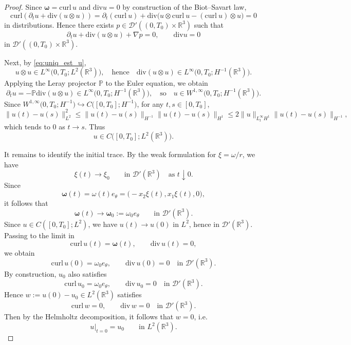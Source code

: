 \documentclass[reqno,11pt]{amsart}
\renewcommand{\div}{\mathrm{div}}
\begin{document}
\begin{proof}
Since $\boldsymbol{\omega}=\mathrm{curl}\,  u$ and $\div u=0$ by construction of the Biot--Savart law,
\[
\mathrm{curl}\left(\partial_tu+\div(u\otimes u)\right)
=
\partial_t(\mathrm{curl} \ u)+\div\bigl(u\otimes \mathrm{curl}\ u-( \mathrm{curl}\ u)\otimes u\bigr)=0
\]
in distributions. Hence there exists
$p\in\mathcal D'((0,T_0)\times\mathbb R^3)$ such that
\[
\partial_t u+\div(u\otimes u)+\nabla p=0,
\qquad
\div u=0
\]
in $\mathcal D'((0,T_0)\times\mathbb R^3)$.

Next, by \eqref{eq:uniq_est_u},
\[
u\otimes u\in L^\infty\!\bigl(0,T_0;L^2(\mathbb R^3)\bigr),
\quad \text{hence} \quad
\div(u\otimes u)\in L^\infty\!\bigl(0,T_0;H^{-1}(\mathbb R^3)\bigr).
\]
Applying the Leray projector $\mathbb P$ to the Euler equation, we obtain
\[
\partial_tu=-\mathbb P\div(u\otimes u)
\in L^\infty\!\bigl(0,T_0;H^{-1}(\mathbb R^3)\bigr),
\quad \text{so} \quad 
u\in W^{1,\infty}\!\bigl(0,T_0;H^{-1}(\mathbb R^3)\bigr).
\]
Since $W^{1,\infty}\big(0,T_0;H^{-1}\big)\hookrightarrow C\big([0,T_0];H^{-1}\big)$, for any
$t,s\in[0,T_0]$,
\[
\|u(t)-u(s)\|_{L^2}^2
\le
\|u(t)-u(s)\|_{H^{-1}}
\|u(t)-u(s)\|_{H^1}
\le
2\|u\|_{L^\infty_tH^1}\|u(t)-u(s)\|_{H^{-1}},
\]
which tends to $0$ as $t\to s$. Thus
\[
u\in C\big([0,T_0];L^2(\mathbb R^3)\big).
\]

It remains to identify the initial trace. 
By the weak formulation for \(\xi=\omega/r\), we have
\[
\xi(t)\to \xi_0
\qquad\text{in }\mathcal D'(\mathbb R^3)
\quad\text{as }t\downarrow0.
\]
Since
\[
\boldsymbol\omega(t)=\omega(t)e_\theta
=\big(-x_2\xi(t),x_1\xi(t),0\big),
\]
it follows that
\[
\boldsymbol\omega(t)\to \boldsymbol\omega_0
:=\omega_0 e_\theta
\qquad\text{in }\mathcal D'(\mathbb R^3).
\]
Since $u\in C([0,T_0];L^2)$, we have $u(t)\to u(0)$ in $L^2$, hence in
$\mathcal D'(\mathbb R^3)$. Passing to the limit in
\[
\mathrm{curl}\, u(t)=\boldsymbol{\omega}(t),
\qquad
\div \, u(t)=0,
\]
we obtain
\[
\mathrm{curl}\, u(0)=\omega_0 e_\theta,
\qquad
\div\,  u(0)=0
\quad\text{in }\mathcal D'(\mathbb R^3).
\]
By construction, $u_0$ also satisfies
\[
\mathrm{curl}\, u_0=\omega_0 e_\theta,
\qquad
\div \, u_0=0
\quad\text{in }\mathcal D'(\mathbb R^3).
\]
Hence $w:=u(0)-u_0\in L^2(\mathbb R^3)$
satisfies
\[
\mathrm{curl}\, w=0,
\qquad
\div\, w=0
\quad\text{in }\mathcal D'(\mathbb R^3).
\]
Then by the Helmholtz decomposition, it follows that $w=0$, i.e.
\[
u|_{t=0}=u_0
\qquad\text{in }L^2(\mathbb R^3).
\]
\end{proof}
\end{document}
